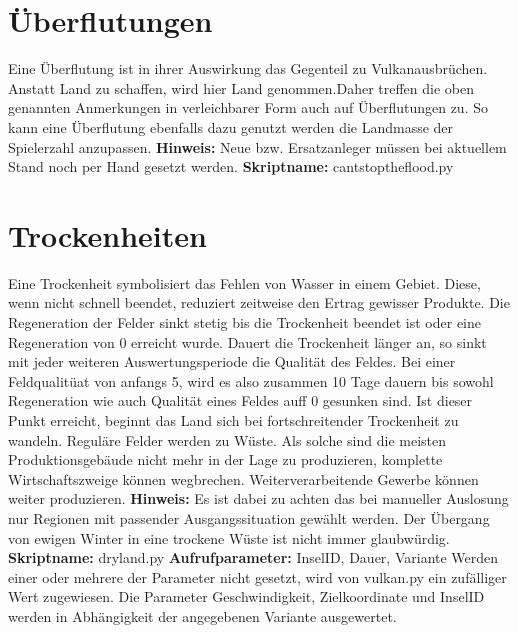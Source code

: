 \section {{\"U}berflutungen}
Eine {\"U}berflutung ist in ihrer Auswirkung das Gegenteil zu
Vulkanausbr{\"u}chen. Anstatt Land zu schaffen, wird
hier Land genommen.\newline Daher treffen die oben genannten Anmerkungen in
verleichbarer Form auch auf {\"U}berflutungen zu. So kann eine {\"U}berflutung ebenfalls dazu genutzt werden die Landmasse der Spielerzahl anzupassen.\newline
\newline
\textbf{Hinweis:} Neue bzw. Ersatzanleger m{\"u}ssen bei aktuellem Stand noch
per Hand gesetzt werden.
\newline\newline
\textbf{Skriptname:} cantstoptheflood.py

\section {Trockenheiten}
Eine Trockenheit symbolisiert das Fehlen von Wasser in einem Gebiet. Diese, wenn
nicht schnell beendet, reduziert zeitweise den Ertrag gewisser Produkte. Die
Regeneration der Felder sinkt stetig bis die Trockenheit beendet ist oder eine
Regeneration von 0 erreicht wurde. Dauert die Trockenheit l{\"a}nger an, so
sinkt mit jeder weiteren Auswertungsperiode die Qualit{\"a}t des Feldes. Bei
einer Feldqualit{\"ua}t von anfangs 5, wird es also zusammen 10 Tage dauern bis
sowohl Regeneration wie auch Qualit{\"a}t eines Feldes auff 0 gesunken
sind.\newline 
Ist dieser Punkt erreicht, beginnt das Land sich bei fortschreitender
Trockenheit zu wandeln. Regul{\"a}re Felder werden zu W{\"u}ste. Als
solche sind die meisten Produktionsgeb{\"a}ude nicht mehr in der Lage zu
produzieren, komplette Wirtschaftszweige k{\"o}nnen wegbrechen.
Weiterverarbeitende Gewerbe k{\"o}nnen weiter produzieren.\newline
\newline \textbf{Hinweis:} Es ist dabei zu achten das bei manueller Ausl{o}sung nur Regionen mit passender Ausgangssituation gew{\"a}hlt werden. Der {\"U}bergang von ewigen Winter in eine trockene W{\"u}ste ist nicht immer
glaubw{\"u}rdig.
\newline\newline
\textbf{Skriptname:} dryland.py
\newline\newline
\textbf{Aufrufparameter:} InselID, Dauer, Variante\newline \newline
Werden einer oder mehrere der Parameter nicht gesetzt, wird von vulkan.py ein
zuf{\"a}lliger Wert zugewiesen. Die Parameter Geschwindigkeit, Zielkoordinate
und InselID werden in Abh{\"a}ngigkeit der angegebenen Variante ausgewertet.

